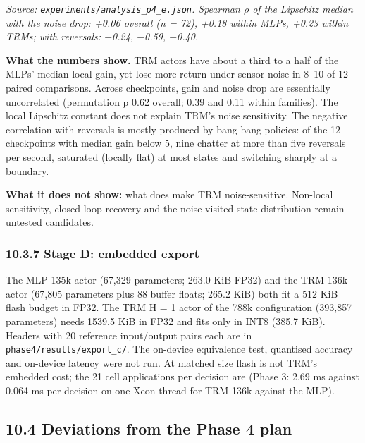 \documentclass[11pt]{article}
\begin{document}
\emph{Source: \texttt{experiments/\allowbreak{}analysis\_\allowbreak{}p4\_\allowbreak{}e.\allowbreak{}json}. Spearman $\rho$ of the Lipschitz median with the noise drop: +0.06 overall (n = 72), +0.18 within MLPs, +0.23 within TRMs; with reversals: $-$0.24, $-$0.59, $-$0.40.}



\textbf{What the numbers show.} TRM actors have about a third to a half of the MLPs' median local gain, yet lose more return under sensor noise in 8--10 of 12 paired comparisons. Across checkpoints, gain and noise drop are essentially uncorrelated (permutation p 0.62 overall; 0.39 and 0.11 within families). The local Lipschitz constant does not explain TRM's noise sensitivity. The negative correlation with reversals is mostly produced by bang-bang policies: of the 12 checkpoints with median gain below 5, nine chatter at more than five reversals per second, saturated (locally flat) at most states and switching sharply at a boundary.



\textbf{What it does not show:} what does make TRM noise-sensitive. Non-local sensitivity, closed-loop recovery and the noise-visited state distribution remain untested candidates.



\subsubsection*{10.3.7 Stage D: embedded export}



The MLP 135k actor (67,329 parameters; 263.0 KiB FP32) and the TRM 136k actor (67,805 parameters plus 88 buffer floats; 265.2 KiB) both fit a 512 KiB flash budget in FP32. The TRM H = 1 actor of the 788k configuration (393,857 parameters) needs 1539.5 KiB in FP32 and fits only in INT8 (385.7 KiB). Headers with 20 reference input/output pairs each are in \texttt{phase4/\allowbreak{}results/\allowbreak{}export\_\allowbreak{}c/\allowbreak{}}. The on-device equivalence test, quantised accuracy and on-device latency were not run. At matched size flash is not TRM's embedded cost; the 21 cell applications per decision are (Phase 3: 2.69 ms against 0.064 ms per decision on one Xeon thread for TRM 136k against the MLP).



\subsection*{10.4 Deviations from the Phase 4 plan}
\end{document}

